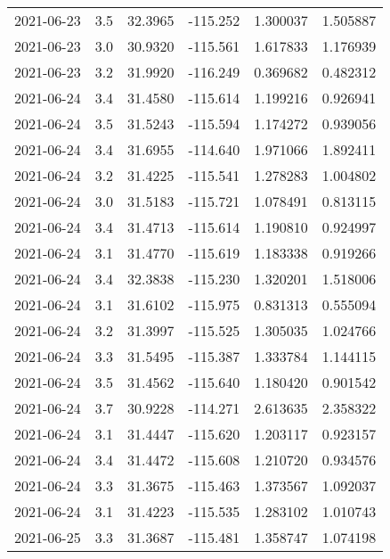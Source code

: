 \begin{tabular}{lrrrrr}
2021-06-23 &       3.5 &  32.3965 &  -115.252 &         1.300037 &         1.505887 \\
2021-06-23 &       3.0 &  30.9320 &  -115.561 &         1.617833 &         1.176939 \\
2021-06-23 &       3.2 &  31.9920 &  -116.249 &         0.369682 &         0.482312 \\
2021-06-24 &       3.4 &  31.4580 &  -115.614 &         1.199216 &         0.926941 \\
2021-06-24 &       3.5 &  31.5243 &  -115.594 &         1.174272 &         0.939056 \\
2021-06-24 &       3.4 &  31.6955 &  -114.640 &         1.971066 &         1.892411 \\
2021-06-24 &       3.2 &  31.4225 &  -115.541 &         1.278283 &         1.004802 \\
2021-06-24 &       3.0 &  31.5183 &  -115.721 &         1.078491 &         0.813115 \\
2021-06-24 &       3.4 &  31.4713 &  -115.614 &         1.190810 &         0.924997 \\
2021-06-24 &       3.1 &  31.4770 &  -115.619 &         1.183338 &         0.919266 \\
2021-06-24 &       3.4 &  32.3838 &  -115.230 &         1.320201 &         1.518006 \\
2021-06-24 &       3.1 &  31.6102 &  -115.975 &         0.831313 &         0.555094 \\
2021-06-24 &       3.2 &  31.3997 &  -115.525 &         1.305035 &         1.024766 \\
2021-06-24 &       3.3 &  31.5495 &  -115.387 &         1.333784 &         1.144115 \\
2021-06-24 &       3.5 &  31.4562 &  -115.640 &         1.180420 &         0.901542 \\
2021-06-24 &       3.7 &  30.9228 &  -114.271 &         2.613635 &         2.358322 \\
2021-06-24 &       3.1 &  31.4447 &  -115.620 &         1.203117 &         0.923157 \\
2021-06-24 &       3.4 &  31.4472 &  -115.608 &         1.210720 &         0.934576 \\
2021-06-24 &       3.3 &  31.3675 &  -115.463 &         1.373567 &         1.092037 \\
2021-06-24 &       3.1 &  31.4223 &  -115.535 &         1.283102 &         1.010743 \\
2021-06-25 &       3.3 &  31.3687 &  -115.481 &         1.358747 &         1.074198 \\

\end{tabular}
